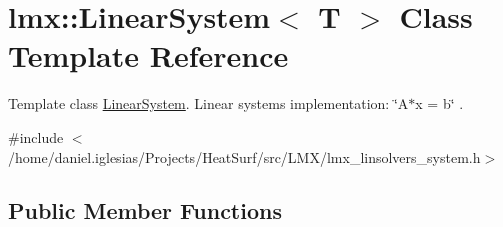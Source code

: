 \hypertarget{classlmx_1_1LinearSystem}{\section{lmx\-:\-:Linear\-System$<$ T $>$ Class Template Reference}
\label{classlmx_1_1LinearSystem}
}


Template class \hyperlink{classlmx_1_1LinearSystem}{Linear\-System}. Linear systems implementation\-: \char`\"{}\-A$\ast$x = b\char`\"{} .  




{\ttfamily \#include $<$/home/daniel.\-iglesias/\-Projects/\-Heat\-Surf/src/\-L\-M\-X/lmx\-\_\-linsolvers\-\_\-system.\-h$>$}

\subsection*{Public Member Functions}
